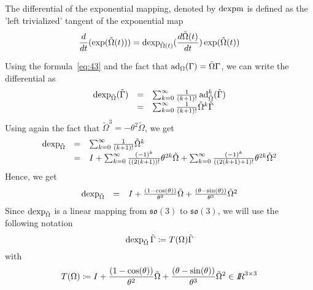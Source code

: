 
The differential of the exponential mapping, denoted by $\operatorname{dexpm}$ is defined as the 'left trivialized' tangent of the exponential map
\begin{equation}
  \label{eq:72}
   \frac{d}{dt} (\exp(\tilde \Omega(t))) = \operatorname{dexp}_{\tilde\Omega(t)}(\frac{d \tilde{\Omega}(t)}{dt}) \exp(\tilde\Omega(t))
\end{equation}

Using the formula~\eqref{eq:43} and the fact that $\operatorname{ad}_\Omega(\Gamma) = \Tilde\Omega \Gamma$, we can write the differential as
\begin{equation}
  \label{eq:122}
  \begin{array}{lcl}
    \operatorname{dexp}_{\tilde\Omega}(\tilde\Gamma) &=& \sum_{k=0}^\infty \frac{1}{(k+1)!} \operatorname{ad}_{\tilde \Omega}^k (\tilde\Gamma) \\
                                       &=& \sum_{k=0}^\infty \frac{1}{(k+1)!} \tilde\Omega^k \tilde \Gamma \\
  \end{array}
\end{equation}
Using again the fact that $\tilde\Omega^3 = -\theta^2 \tilde\Omega$, we get
\begin{equation}
  \label{eq:123}
   \begin{array}{lcl}
     \operatorname{dexp}_{\tilde\Omega} &=& \sum_{k=0}^\infty  \frac{1}{(k+1)!} \tilde\Omega^k \\
                          &=& I  + \sum_{k=0}^\infty  \frac{(-1)^k}{((2(k+1))!} \theta^{2k} \tilde\Omega + \sum_{k=0}^\infty  \frac{(-1)^k}{((2(k+1)+1)!} \theta^{2k} \tilde\Omega^2\\
  \end{array}
\end{equation}
Hence, we get
\begin{equation}
  \label{eq:124}
   \begin{array}{lcl}
     \operatorname{dexp}_{\tilde\Omega}  &=& I  + \frac{(1-\cos(\theta))}{\theta^2}\tilde\Omega + \frac{(\theta-\sin(\theta))}{\theta^3}\tilde\Omega^2 
  \end{array}
\end{equation}
Since $\operatorname{dexp}_{\tilde\Omega}$ is a linear mapping from $\mathfrak{so(3)}$ to $\mathfrak{so(3)}$, we will use the following notation
\begin{equation}
  \label{eq:172}
  \operatorname{dexp}_{\tilde\Omega}\tilde\Gamma  \coloneqq T(\Omega)\tilde\Gamma 
\end{equation}
with
\begin{equation}
  \label{eq:173}
   T(\Omega) \coloneqq I  + \frac{(1-\cos(\theta))}{\theta^2}\tilde\Omega + \frac{(\theta-\sin(\theta))}{\theta^3}\tilde\Omega^2  \in \mbox{\rm $I\!\!R$}^{3\times 3}
\end{equation}




